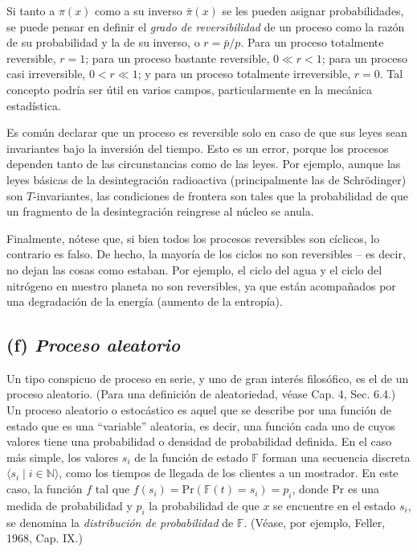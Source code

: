 \begin{justifying}
    Si tanto a $\pi(x)$ como a su inverso $\bar{\pi}(x)$ se les pueden asignar 
    probabilidades, se puede pensar en definir el \textit{grado de reversibilidad} 
    de un proceso como la razón de su probabilidad y la de su inverso, o 
    $r = \bar{p}/p$. Para un proceso totalmente reversible, $r=1$; para un 
    proceso bastante reversible, $0 \ll r < 1$; para un proceso casi irreversible, 
    $0 < r \ll 1$; y para un proceso totalmente irreversible, $r=0$. 
    Tal concepto podría ser útil en varios campos, particularmente en la 
    mecánica estadística.

    Es común declarar que un proceso es reversible solo en caso de que sus leyes 
    sean invariantes bajo la inversión del tiempo. Esto es un error, porque los 
    procesos dependen tanto de las circunstancias como de las leyes. Por ejemplo, 
    aunque las leyes básicas de la desintegración radioactiva (principalmente 
    las de Schrödinger) son $T$-invariantes, las condiciones de frontera son tales 
    que la probabilidad de que un fragmento de la desintegración reingrese al 
    núcleo se anula.

    Finalmente, nótese que, si bien todos los procesos reversibles son cíclicos, 
    lo contrario es falso. De hecho, la mayoría de los ciclos no son reversibles – 
    es decir, no dejan las cosas como estaban. Por ejemplo, el ciclo del agua y el 
    ciclo del nitrógeno en nuestro planeta no son reversibles, ya que están 
    acompañados por una degradación de la energía (aumento de la entropía).

    \subsection*{(f)\textit{ Proceso aleatorio}}
    \noindent Un tipo conspicuo de proceso en serie, y uno de gran interés filosófico, 
    es el de un proceso aleatorio. (Para una definición de aleatoriedad, 
    véase Cap. 4, Sec. 6.4.) Un proceso aleatorio o estocástico es aquel 
    que se describe por una función de estado que es una “variable” aleatoria, 
    es decir, una función cada uno de cuyos valores tiene una probabilidad 
    o densidad de probabilidad definida. En el caso más simple, los valores 
    $s_i$ de la función de estado $\mathbb{F}$ forman una secuencia discreta 
    $\langle s_i \mid i \in \mathbb{N} \rangle$, como los tiempos de llegada de 
    los clientes a un mostrador. En este caso, la función $f$ tal que 
    $f(s_i) = \mathrm{Pr}(\mathbb{F}(t) = s_i) = p_i$, donde $\mathrm{Pr}$ 
    es una medida de probabilidad y $p_i$ la probabilidad de que $x$ se encuentre 
    en el estado $s_i$, se denomina la \textit{distribución de probabilidad} 
    de $\mathbb{F}$. (Véase, por ejemplo, Feller, 1968, Cap. IX.)


\end{justifying}
